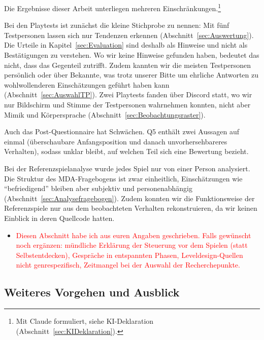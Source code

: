 \documentclass[../Main.tex]{subfiles}
\begin{document}
Die Ergebnisse dieser Arbeit unterliegen mehreren Einschränkungen.\footnote{Mit Claude formuliert, siehe KI-Deklaration (Abschnitt~\ref{sec:KIDeklaration}).}

Bei den Playtests ist zunächst die kleine Stichprobe zu nennen: Mit fünf Testpersonen lassen sich nur Tendenzen erkennen (Abschnitt~\ref{sec:Auswertung}). Die Urteile in Kapitel~\ref{sec:Evaluation} sind deshalb als Hinweise und nicht als Bestätigungen zu verstehen. Wo wir keine Hinweise gefunden haben, bedeutet das nicht, dass das Gegenteil zutrifft. Zudem kannten wir die meisten Testpersonen persönlich oder über Bekannte, was trotz unserer Bitte um ehrliche Antworten zu wohlwollenderen Einschätzungen geführt haben kann (Abschnitt~\ref{sec:AuswahlTP}). Zwei Playtests fanden über Discord statt, wo wir nur Bildschirm und Stimme der Testpersonen wahrnehmen konnten, nicht aber Mimik und Körpersprache (Abschnitt~\ref{sec:Beobachtungsraster}).

Auch das Post-Questionnaire hat Schwächen. Q5 enthält zwei Aussagen auf einmal (überschaubare Anfangsposition und danach unvorhersehbareres Verhalten), sodass unklar bleibt, auf welchen Teil sich eine Bewertung bezieht.

Bei der Referenzspielanalyse wurde jedes Spiel nur von einer Person analysiert. Die Struktur des MDA-Fragebogens ist zwar einheitlich, Einschätzungen wie \enquote{befriedigend} bleiben aber subjektiv und personenabhängig (Abschnitt~\ref{sec:Analysefragebogen}). Zudem konnten wir die Funktionsweise der Referenzspiele nur aus dem beobachteten Verhalten rekonstruieren, da wir keinen Einblick in deren Quellcode hatten.

\begin{itemize}[leftmargin=1.5cm]
    \item \textcolor{red}{Diesen Abschnitt habe ich aus euren Angaben geschrieben. Falls gewünscht noch ergänzen: mündliche Erklärung der Steuerung vor dem Spielen (statt Selbstentdecken), Gespräche in entspannten Phasen, Leveldesign-Quellen nicht genrespezifisch, Zeitmangel bei der Auswahl der Recherchepunkte.}
\end{itemize}

\subsection{Weiteres Vorgehen und Ausblick} \label{sec:Verbesserungen}
\end{document}
